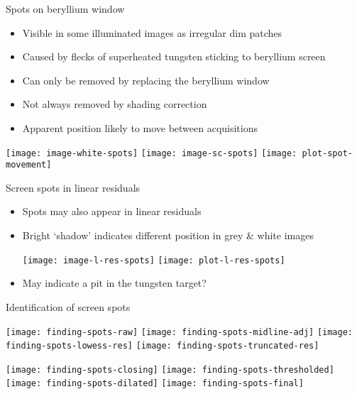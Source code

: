 \documentclass[8pt]{beamer}
\begin{document}
\begin{frame}{Spots on beryllium window}
	\begin{itemize}
		\item Visible in some illuminated images as irregular dim patches
		\item Caused by flecks of superheated tungsten sticking to beryllium screen
		\item Can only be removed by replacing the beryllium window
		\item Not always removed by shading correction
		\item Apparent position likely to move between acquisitions	%
	\end{itemize}
	
	\begin{center}
		\texttt{[image: image-white-spots]}
		\texttt{[image: image-sc-spots]}
		\texttt{[image: plot-spot-movement]}
	\end{center}
\end{frame}


\begin{frame}{Screen spots in linear residuals}

	\begin{itemize}
		\item Spots may also appear in linear residuals
		\item Bright `shadow' indicates different position in grey \& white images
	\begin{center}
		\texttt{[image: image-l-res-spots]}
		\texttt{[image: plot-l-res-spots]}
	\end{center}
		\item May indicate a pit in the tungsten target?
	\end{itemize}	
\end{frame}


\begin{frame}{Identification of screen spots}
	\begin{center}
		\texttt{[image: finding-spots-raw]}
		\texttt{[image: finding-spots-midline-adj]}
		\texttt{[image: finding-spots-lowess-res]}
		\texttt{[image: finding-spots-truncated-res]}
		
		\texttt{[image: finding-spots-closing]}
		\texttt{[image: finding-spots-thresholded]}
		\texttt{[image: finding-spots-dilated]}
		\texttt{[image: finding-spots-final]}
	\end{center}
\end{frame}
\end{document}
